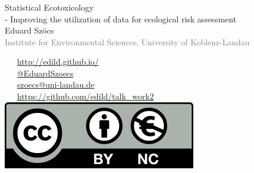 \documentclass[12pt
, t
]{beamer}
\begin{document}
\begin{frame}[plain]
	\frametitle{}
	\vspace{1em}
	\begin{centering}
	\Large \textcolor{title}{Statistical Ecotoxicology \\ - Improving the utilization of data for ecological risk assessment} \\[1em]
	Eduard Szöcs \\[0.3em]
	\tiny \textcolor{gray}{Institute for Environmental Sciences, University of Koblenz-Landau} \\[3em]
	\end{centering}
	\normalsize
	\textcolor{hilight}{\faLaptop}~~~\href{http://edild.github.io/}{http://edild.github.io/ }\\[.5em]
	\textcolor{hilight}{\faTwitter}~~~\href{http://twitter.com/EduardSzoecs}{@EduardSzoecs} 	\\[0.5em]
	\textcolor{hilight}{\faEnvelope}~~~\href{mailto:szoecs@uni-landau.de}{szoecs@uni-landau.de} \\[.5em]
	\textcolor{hilight}{\faGift}~~~\href{https://github.com/edild/talk_work2}{https://github.com/edild/talk\_work2}\\[0.5em]
	\hfill \includegraphics[width =.3\textwidth]{fig/Cc-by-nc_euro_icon.png} 
\end{frame}
\end{document}
